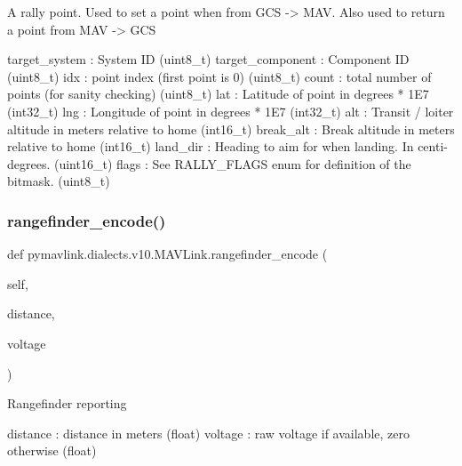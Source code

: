 \begin{DoxyVerb}
\begin{DoxyVerb}
\begin{DoxyVerb}
\begin{DoxyVerb}
\begin{DoxyVerb}A rally point. Used to set a point when from GCS -> MAV. Also used to
return a point from MAV -> GCS

target_system             : System ID (uint8_t)
target_component          : Component ID (uint8_t)
idx                       : point index (first point is 0) (uint8_t)
count                     : total number of points (for sanity checking) (uint8_t)
lat                       : Latitude of point in degrees * 1E7 (int32_t)
lng                       : Longitude of point in degrees * 1E7 (int32_t)
alt                       : Transit / loiter altitude in meters relative to home (int16_t)
break_alt                 : Break altitude in meters relative to home (int16_t)
land_dir                  : Heading to aim for when landing. In centi-degrees. (uint16_t)
flags                     : See RALLY_FLAGS enum for definition of the bitmask. (uint8_t)\end{DoxyVerb}
 \mbox{\label{classpymavlink_1_1dialects_1_1v10_1_1MAVLink_a646350ba0971ced6823adf4d922a5766}} 
\subsubsection{\texorpdfstring{rangefinder\+\_\+encode()}{rangefinder\_encode()}}
{\footnotesize\ttfamily def pymavlink.\+dialects.\+v10.\+M\+A\+V\+Link.\+rangefinder\+\_\+encode (\begin{DoxyParamCaption}\item[{}]{self,  }\item[{}]{distance,  }\item[{}]{voltage }\end{DoxyParamCaption})}

\begin{DoxyVerb}Rangefinder reporting

distance                  : distance in meters (float)
voltage                   : raw voltage if available, zero otherwise (float)\end{DoxyVerb}
 \mbox{\label{classpymavlink_1_1dialects_1_1v10_1_1MAVLink_a307e39052e92e41dad44ee42ee67ce2e}} 

\end{DoxyVerb}
\end{DoxyVerb}
\end{DoxyVerb}
\end{DoxyVerb}
